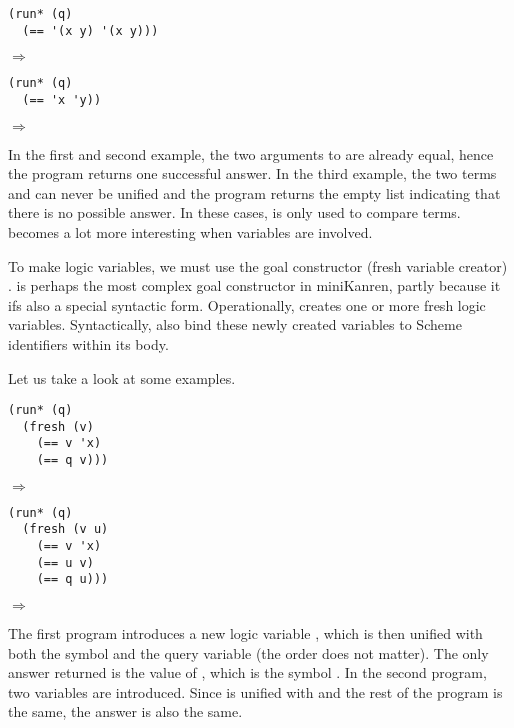 \begin{lstlisting}
(run* (q)
  (== '(x y) '(x y)))
\end{lstlisting}
$\Rightarrow$ 

\begin{lstlisting}
(run* (q)
  (== 'x 'y))
\end{lstlisting}
$\Rightarrow$ \code{()}

In the first and second example, the two arguments to \code{==} are already equal, hence the program returns one successful answer. In the third example, the two terms  and  can never be unified and the program returns the empty list indicating that there is no possible answer. In these cases, \code{==} is only used to compare terms. \code{==} becomes a lot more interesting when variables are involved.

To make logic variables, we must use the goal constructor (fresh variable creator) .  is perhaps the most complex goal constructor in miniKanren, partly because it ifs also a special syntactic form. Operationally,  creates one or more fresh logic variables. Syntactically,  also bind these newly created variables to Scheme identifiers within its body.

Let us take a look at some examples.

\begin{lstlisting}
(run* (q)
  (fresh (v)
    (== v 'x)
    (== q v)))
\end{lstlisting}
$\Rightarrow$ 

\begin{lstlisting}
(run* (q)
  (fresh (v u)
    (== v 'x)
    (== u v)
    (== q u)))
\end{lstlisting}
$\Rightarrow$ 

The first program introduces a new logic variable , which is then unified with both the symbol  and the query variable  (the order does not matter). The only answer returned is the value of , which is the symbol . In the second program, two variables are introduced. Since  is unified with  and the rest of the program is the same, the answer is also the same.


